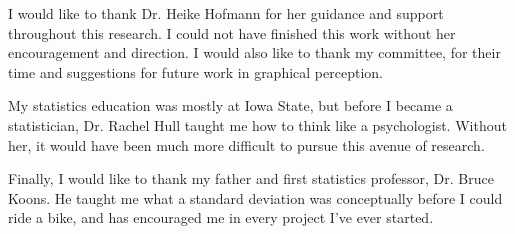 
I would like to thank Dr. Heike Hofmann for her guidance and support throughout this research. I could not have finished this work without her encouragement and direction. 
I would also like to thank my committee, for their time and suggestions for future work in graphical perception. 

My statistics education was mostly at Iowa State, but before I became a statistician, Dr. Rachel Hull taught me how to think like a psychologist. Without her, it would have been much more difficult to pursue this avenue of research.

Finally, I would like to thank my father and first statistics professor, Dr. Bruce Koons. He taught me what a standard deviation was conceptually before I could ride a bike, and has encouraged me in every project I've ever started. 